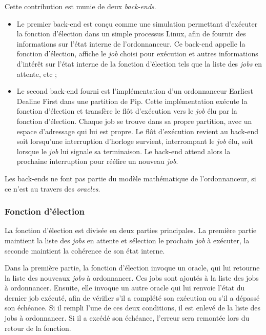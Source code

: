 		Cette contribution est munie de deux \emph{back-ends}.
		\begin{itemize}
			\item Le premier back-end est conçu comme une simulation permettant d'exécuter la fonction d'élection dans un simple processus Linux, afin de fournir des informations sur l'état interne de l'ordonnanceur. Ce back-end appelle la fonction d'élection, affiche le \emph{job} choisi pour exécution et autres informations d'intérêt sur l'état interne de la fonction d'élection tels que la liste des \emph{jobs} en attente, etc ;

			\item Le second back-end fourni est l'implémentation d'un ordonnanceur Earliest Dealine First dans une partition de Pip. Cette implémentation exécute la fonction d'élection et transfère le flôt d'exécution vers le \emph{job} élu par la fonction d'élection. Chaque job se trouve dans sa propre partition, avec un espace d'adressage qui lui est propre. Le flôt d'exécution revient au back-end soit lorsqu'une interruption d'horloge survient, interrompant le \emph{job} élu, soit lorsque le \emph{job} lui signale sa terminaison. Le back-end attend alors la prochaine interruption pour réélire un nouveau \emph{job}.
		\end{itemize}

		Les back-ends ne font pas partie du modèle mathématique de l'ordonnanceur, si ce n'est au travers des \emph{oracles}.

		\subsubsection{Fonction d'élection}

		La fonction d'élection est divisée en deux parties principales. La première partie maintient la liste des \emph{jobs} en attente et sélection le prochain \emph{job} à exécuter, la seconde maintient la cohérence de son état interne.

		Dans la première partie, la fonction d'élection invoque un oracle, qui lui retourne la liste des nouveaux \emph{jobs} à ordonnancer. Ces jobs sont ajoutés à la liste des jobs à ordonnancer. Ensuite, elle invoque un autre oracle qui lui renvoie l'état du dernier job exécuté, afin de vérifier s'il a complété son exécution ou s'il a dépassé son échéance. Si il rempli l'une de ces deux conditions, il est enlevé de la liste des jobs à ordonnancer. Si il a excédé son échéance, l'erreur sera remontée lors du retour de la fonction.


